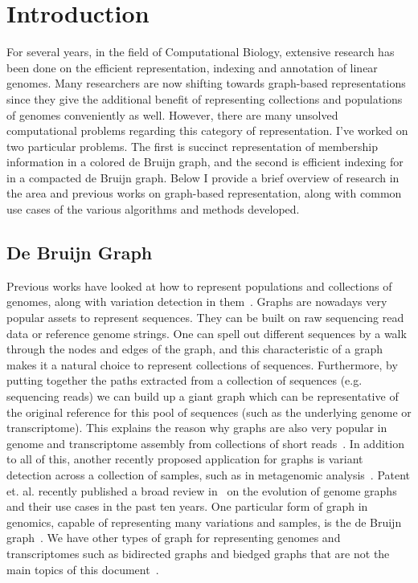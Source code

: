 \chapter{Introduction}

For several years, in the field of Computational Biology, extensive research has been done on the efficient representation, indexing and annotation of linear genomes. Many researchers are now shifting towards graph-based representations since they give the additional benefit of representing collections and populations of genomes conveniently as well. However, there are many unsolved computational problems regarding this category of representation. I’ve worked on two particular problems. The first is succinct representation of membership information in a colored de Bruijn graph, and the second is efficient indexing for \kmers in a compacted de Bruijn graph. Below I provide a brief overview of research in the area and previous works on graph-based representation, along with common use cases of the various algorithms and methods developed.


\section{De Bruijn Graph}
\label{subsec:dbg}
Previous works have looked at how to represent populations and collections of genomes, along with variation detection in them~\cite{paten2017genome}. Graphs are nowadays very popular assets to represent sequences. They can be built on raw sequencing read data or reference genome strings. One can spell out different sequences by a walk through the nodes and edges of the graph, and this characteristic of a graph makes it a natural choice to represent collections of sequences. Furthermore, by putting together the paths extracted from a collection of sequences (e.g. sequencing reads) we can build up a giant graph which can be representative of the original reference for this pool of sequences (such as the underlying genome or transcriptome). This explains the reason why graphs are also very popular in genome and transcriptome assembly from collections of short reads~\cite{pevzner2001eulerian,grabherr2011full,chang2015bridger,kannan2016shannon}. In addition to all of this, another recently proposed application for graphs is variant detection across a collection of samples, such as in metagenomic analysis~\cite{Iqbal2012Novo,MuggliBoNo17}. Patent et. al. recently published a broad review in~\cite{paten2017genome} on the evolution of genome graphs and their use cases in the past ten years. One particular form of graph in genomics, capable of representing many variations and samples, is the de Bruijn graph~\cite{pevzner2001eulerian,zerbino2007velvet,Bruijn46}. We have other types of graph for representing genomes and transcriptomes such as bidirected graphs \cite{edmonds2003matching,medvedev2009maximum} and biedged graphs that are not the main topics of this document~\cite{paten2017genome}.


